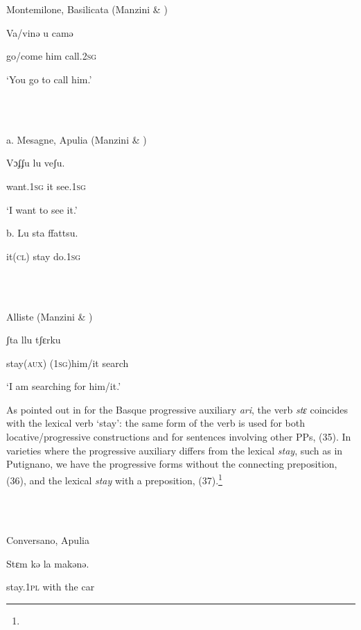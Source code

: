 \documentclass[output=paper]{langsci/langscibook}
\begin{document}
\ea%
    \label{ex:key:32}
    \gll\\
        \\
    \glt
    \z

          Montemilone, Basilicata (Manzini \& \citealt{Savoia2005})

Va/vinə   u    camə         

go/come  him   call.\textsc{2sg}

‘You go to call him.’ 

\ea%
    \label{ex:key:33}
    \gll\\
        \\
    \glt
    \z

          a.  Mesagne, Apulia (Manzini \& \citealt{Savoia2005})

Vɔʄʄu     lu  veʃu.      

want.\textsc{1sg} it   see.\textsc{1sg}

‘I want to see it.’ 

  b.  Lu   sta   ffattsu.

it\textsc{(cl)}  stay  do.\textsc{1sg}

\ea%
    \label{ex:key:34}
    \gll\\
        \\
    \glt
    \z

          Alliste (Manzini \& \citealt{Savoia2005})

ʃta     llu     tʃɛrku    

stay\textsc{(aux)} (\textsc{1sg})him/it  search

‘I am searching for him/it.’ 

As pointed out in \citet{Laka2006} for the Basque progressive auxiliary \textit{ari}, the verb \textit{stɛ} coincides with the lexical verb ‘stay’: the same form of the verb is used for both locative/progressive constructions and for sentences involving other PPs, (35). In varieties where the progressive auxiliary differs from the lexical \textit{stay}, such as in Putignano, we have the progressive forms without the connecting preposition, (36), and the lexical \textit{stay} with a preposition, (37).\footnote{}

\ea%
    \label{ex:key:35}
    \gll\\
        \\
    \glt
    \z

          Conversano, Apulia

Stɛm     kə  la   makənə.       

stay.\textsc{1pl} with   the  car 
\end{document}
